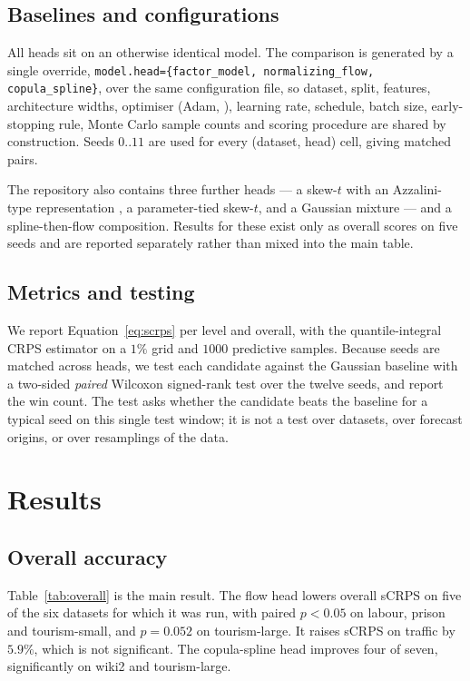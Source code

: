 \documentclass[11pt]{article}
\begin{document}
\subsection{Baselines and configurations}
All heads sit on an otherwise identical model. The comparison is generated by a
single override, \texttt{model.head=\{factor\_model, normalizing\_flow,
copula\_spline\}}, over the same configuration file, so dataset, split, features,
architecture widths, optimiser (Adam, \citealp{kingma2015adam}), learning rate,
schedule, batch size, early-stopping rule, Monte Carlo sample counts and scoring
procedure are shared by construction. Seeds $0..11$ are used for every
(dataset, head) cell, giving matched pairs.

The repository also contains three further heads --- a skew-$t$ with an
Azzalini-type representation \citep{azzalini2003skewt}, a parameter-tied skew-$t$,
and a Gaussian mixture --- and a spline-then-flow composition. Results for these
exist only as overall scores on five seeds and are reported separately rather than
mixed into the main table.

\subsection{Metrics and testing}
We report Equation~\eqref{eq:scrps} per level and overall, with the quantile-integral
CRPS estimator on a $1\%$ grid and $1000$ predictive samples. Because seeds are
matched across heads, we test each candidate against the Gaussian baseline with a
two-sided \emph{paired} Wilcoxon signed-rank test over the twelve seeds, and report
the win count. The test asks whether the candidate beats the baseline for a typical
seed on this single test window; it is not a test over datasets, over forecast
origins, or over resamplings of the data.

\section{Results}
\label{sec:results}

\subsection{Overall accuracy}
Table~\ref{tab:overall} is the main result. The flow head lowers overall sCRPS on
five of the six datasets for which it was run, with paired $p < 0.05$ on labour,
prison and tourism-small, and $p = 0.052$ on tourism-large. It raises sCRPS on
traffic by $5.9\%$, which is not significant. The copula-spline head improves four
of seven, significantly on wiki2 and tourism-large.
\end{document}
